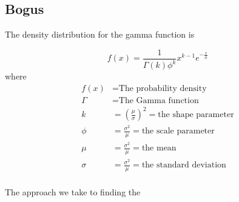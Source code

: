 \documentclass[paper=a4, fontsize=11pt]{scrartcl}
\numberwithin{equation}{section}		%
\numberwithin{figure}{section}			%
\numberwithin{table}{section}				%
\begin{document}
\begin{appendices}
\section{Bogus}
The density distribution for the gamma function is

\begin{equation} \label{eq:gamma_dist}
f\left(x\right) = \frac{1}{\Gamma\left(k\right)\phi^k}x^{k-1}e^{-\frac{x}{\phi}}
\end{equation}
where 
\begin{align*}
        f\left(x\right) &= \text{The probability density}\\
        \Gamma &= \text{The Gamma function}\\
        k &= \left(\frac{\mu}{\sigma}\right)^2 = \text{the shape parameter} \\
        \phi &= \frac{\sigma^2}{\mu} = \text{the scale parameter} \\
        \mu &= \frac{\sigma^2}{\mu} = \text{the mean} \\
        \sigma &= \frac{\sigma^2}{\mu} = \text{the standard deviation} \\
\end{align*}

\par  The approach we take to finding the 


\end{appendices}




\end{document}
